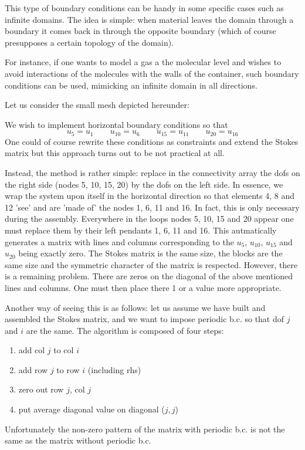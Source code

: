 
This type of boundary conditions can be handy in some specific cases such 
as infinite domains. The idea is simple: when material leaves the domain 
through a boundary it comes back in through the opposite boundary (which 
of course presupposes a certain topology of the domain). 

For instance, if one wants to model a gas a the molecular level and wishes 
to avoid interactions of the molecules with the walls of the container, 
such boundary conditions can be used, mimicking an infinite domain in all 
directions. 

Let us consider the small mesh depicted hereunder:

We wish to implement horizontal boundary conditions so that 
\[
u_5=u_1
\quad\quad
u_{10}=u_6
\quad\quad
u_{15}=u_{11}
\quad\quad
u_{20}=u_{16}
\]
One could of course rewrite these conditions as constraints and extend the Stokes 
matrix but this approach turns out to be not practical at all. 

Instead, the method is rather simple: replace in the connectivity array the dofs on the right side
(nodes 5, 10, 15, 20) by the dofs on the left side. In essence, we wrap the system upon itself 
in the horizontal direction so that elements 4, 8 and 12 'see' and are 'made of' the nodes 1, 6, 11 and 16.
In fact, this is only necessary during the assembly. Everywhere in the loops nodes 5, 10, 15 and 20 appear 
one must replace them by their left pendants 1, 6, 11 and 16. This autmatically generates a matrix 
with lines and columns corresponding to the $u_5$, $u_{10}$, $u_{15}$ and $u_{20}$ being exactly zero. 
The Stokes matrix is the same size, the blocks are the same size and the symmetric character of the matrix 
is respected. However, there is a remaining problem. There are zeros on the diagonal 
of the above mentioned lines and columns. One must then place there 1 or a value more
appropriate.

Another way of seeing this is as follows: let us assume we have built and assembled
the Stokes matrix, and we want to impose periodic b.c. so that dof $j$ and $i$ are the same. 
The algorithm is composed of four steps:
\begin{enumerate} 
\item add col $j$ to col $i$
\item add row $j$ to row $i$ (including rhs)
\item zero out row $j$, col $j$
\item put average diagonal value on diagonal ($j,j$)
\end{enumerate} 

\begin{remark}
Unfortunately the non-zero pattern of the matrix with periodic b.c. is not the same 
as the matrix without periodic b.c.
\end{remark}


